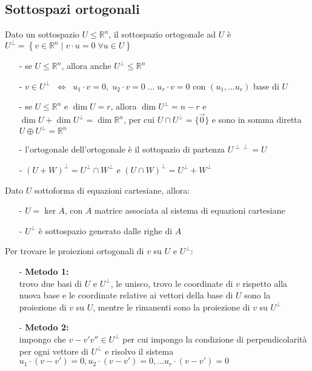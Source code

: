 \documentclass[a4paper]{article}
\begin{document}
\subsection{Sottospazi ortogonali}
Dato un sottospazio \(U \leq \mathbb{R}^n\), il sottospazio ortogonale ad \(U\) è \(U^\perp = \left\{ v \in \mathbb{R}^n \; | \; v \cdot u = 0 \; \forall u \in U \right\}\)
\begin{itemize}[topsep=3pt, itemsep=0pt]
	\item[-] se \(U \leq \mathbb{R}^n\), allora anche \(U^\perp \leq \mathbb{R}^n\)
	\item[-] \(v \in U^\perp \;\; \Leftrightarrow \;\; u_1 \cdot v = 0, \; u_2 \cdot v = 0 \; \dots \; u_r \cdot v = 0\) con \((u_1, \dots u_r)\) base di \(U\)
	\item[-] se \(U \leq \mathbb{R}^n\) e \(\dim U = r\), allora \(\dim U^\perp = n-r\) e \(\dim U + \dim U^\perp = \dim \mathbb{R}^n\), per cui \(U \cap U^\perp = \{ \vec{0} \}\)
	e sono in somma diretta \(U \oplus U^\perp = \mathbb{R}^n\)
	\item[-] l'ortogonale dell'ortogonale è il sottopazio di partenza \(U^{\perp\perp} = U\)
	\item[-] \((U+W)^\perp = U^\perp \cap W^\perp\) e \((U \cap W)^\perp = U^\perp + W^\perp\)
\end{itemize}
Dato \(U\) sottoforma di equazioni cartesiane, allora:
\begin{itemize}[topsep=3pt, itemsep=0pt]
	\item[-] \(U = \ker A\), con \(A\) matrice associata al sistema di equazioni cartesiane
	\item[-] \(U^\perp\) è sottospazio generato dalle righe di \(A\)
\end{itemize}
Per trovare le proiezioni ortogonali di \(v\) su \(U\) e \(U^\perp\):
\begin{itemize}[topsep=3pt, itemsep=0pt]
	\item[-] \textbf{Metodo 1:}\\
	trovo due basi di \(U\) e \(U^\perp\), le unisco, trovo le coordinate di \(v\) rispetto alla nuova base e le coordinate relative
	ai vettori della base di \(U\) sono la proiezione di \(v\) su \(U\), mentre le rimanenti sono la proiezione di \(v\) su \(U^\perp\)
	\item[-] \textbf{Metodo 2:}\\
	impongo che \(v-v' v'' \in U^\perp\) per cui impongo la condizione di perpendicolarità per ogni vettore di \(U^\perp\) e risolvo
	il sistema \(u_1 \cdot (v-v') = 0, u_2 \cdot (v-v') = 0, \dots u_r \cdot (v-v') = 0\) 
\end{itemize}
\end{document}
